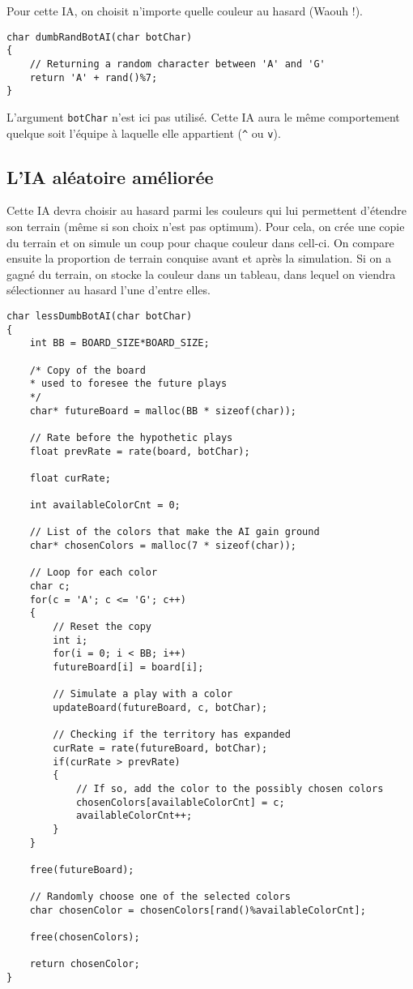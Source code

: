 \documentclass[a4paper,11pt]{article}
\begin{document}
	Pour cette IA, on choisit n'importe quelle couleur au hasard (Waouh !).
	
	\begin{lstlisting}
char dumbRandBotAI(char botChar)
{
	// Returning a random character between 'A' and 'G'
	return 'A' + rand()%7;
}\end{lstlisting}
	
	L'argument \texttt{botChar} n'est ici pas utilis\'e. Cette IA aura le m\^eme comportement quelque soit l'\'equipe \`a laquelle elle appartient (\texttt{\^} ou \texttt{v}).
	
	
	\subsection{L'IA al\'eatoire am\'elior\'ee}
	
	Cette IA devra choisir au hasard parmi les couleurs qui lui permettent d'\'etendre son terrain (m\^eme si son choix n'est pas optimum). Pour cela, on cr\'ee une copie du terrain et on simule un coup pour chaque couleur dans cell-ci. On compare ensuite la proportion de terrain conquise avant et apr\`es la simulation. Si on a gagn\'e du terrain, on stocke la couleur dans un tableau, dans lequel on viendra s\'electionner au hasard l'une d'entre elles.
	
	\begin{lstlisting}
char lessDumbBotAI(char botChar)
{
	int BB = BOARD_SIZE*BOARD_SIZE;
	
	/* Copy of the board
	* used to foresee the future plays
	*/
	char* futureBoard = malloc(BB * sizeof(char));
	
	// Rate before the hypothetic plays
	float prevRate = rate(board, botChar);
	
	float curRate;
	
	int availableColorCnt = 0;
	
	// List of the colors that make the AI gain ground
	char* chosenColors = malloc(7 * sizeof(char));
	
	// Loop for each color
	char c;
	for(c = 'A'; c <= 'G'; c++)
	{
		// Reset the copy
		int i;
		for(i = 0; i < BB; i++)
		futureBoard[i] = board[i];
		
		// Simulate a play with a color
		updateBoard(futureBoard, c, botChar);
		
		// Checking if the territory has expanded
		curRate = rate(futureBoard, botChar);
		if(curRate > prevRate)
		{
			// If so, add the color to the possibly chosen colors
			chosenColors[availableColorCnt] = c;
			availableColorCnt++;
		}
	}
	
	free(futureBoard);
	
	// Randomly choose one of the selected colors
	char chosenColor = chosenColors[rand()%availableColorCnt];
	
	free(chosenColors);
	
	return chosenColor;
}\end{lstlisting}
	
\end{document}
